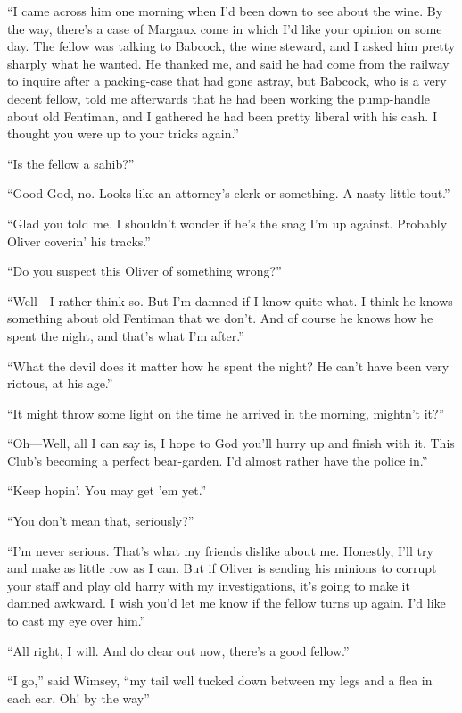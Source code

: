 \enquote{I came across him one morning when I'd been down to see about the wine. By the way, there's a case of Margaux come in which I'd like your opinion on some day. The fellow was talking to Babcock, the wine steward, and I asked him pretty sharply what he wanted. He thanked me, and said he had come from the railway to inquire after a packing-case that had gone astray, but Babcock, who is a very decent fellow, told me afterwards that he had been working the pump-handle about old Fentiman, and I gathered he had been pretty liberal with his cash. I thought you were up to your tricks again.}

\enquote{Is the fellow a sahib?}

\enquote{Good God, no. Looks like an attorney's clerk or something. A nasty little tout.}

\enquote{Glad you told me. I shouldn't wonder if he's the snag I'm up against. Probably Oliver coverin' his tracks.}

\enquote{Do you suspect this Oliver of something wrong?}

\enquote{Well\allowbreak---\allowbreak I rather think so. But I'm damned if I know quite what. I think he knows something about old Fentiman that we don't. And of course he knows how he spent the night, and that's what I'm after.}

\enquote{What the devil does it matter how he spent the night? He can't have been very riotous, at his age.}

\enquote{It might throw some light on the time he arrived in the morning, mightn't it?}

\enquote{Oh\allowbreak---\allowbreak Well, all I can say is, I hope to God you'll hurry up and finish with it. This Club's becoming a perfect bear-garden. I'd almost rather have the police in.}

\enquote{Keep hopin'. You may get 'em yet.}

\enquote{You don't mean that, seriously?}

\enquote{I'm never serious. That's what my friends dislike about me. Honestly, I'll try and make as little row as I can. But if Oliver is sending his minions to corrupt your staff and play old harry with my investigations, it's going to make it damned awkward. I wish you'd let me know if the fellow turns up again. I'd like to cast my eye over him.}

\enquote{All right, I will. And do clear out now, there's a good fellow.}

\enquote{I go,} said Wimsey, \enquote{my tail well tucked down between my legs and a flea in each ear. Oh! by the way\longdash}

